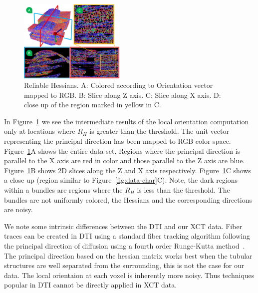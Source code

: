 \begin{figure}[h]
\centering
\includegraphics[width=0.45\textwidth]{imagesMT2014/MT_data_rh.png}
\caption{Reliable Hessians. A: Colored according to Orientation vector mapped to RGB. B: Slice along Z axis. C: Slice along X axis. D: close up of the region marked in yellow in C.}
\label{fig:reliable_hessian}
\end{figure}
 In Figure~\ref{fig:reliable_hessian} we see the intermediate results of the local orientation computation only at locations where $R_{H}$ is greater than the threshold. The unit vector representing the principal direction has been mapped to RGB color space. Figure~\ref{fig:reliable_hessian}A shows the entire data set. Regions where the principal direction is parallel to the X axis are red in color and those parallel to the Z axis are blue. Figure~\ref{fig:reliable_hessian}B shows 2D slices along the Z and X axis respectively. Figure~\ref{fig:reliable_hessian}C shows a close up (region similar to Figure~\ref{fig:data-char}C). Note, the dark regions within a bundles are regions where the $R_H$ is less than the threshold. The bundles are not uniformly colored, the Hessians and the corresponding directions are noisy.

 
 
 We note some intrinsic differences between the DTI and our XCT data. Fiber traces can be created in DTI using a standard fiber tracking algorithm following the principal direction of diffusion using a fourth order Runge-Kutta method~\cite{Brun2003}. The principal direction based on the hessian matrix works best when the tubular structures are well separated from the surrounding, this is not the case for our data. The local orientaion at each voxel is inherently more noisy. Thus techniques popular in DTI cannot be directly applied in XCT data.




